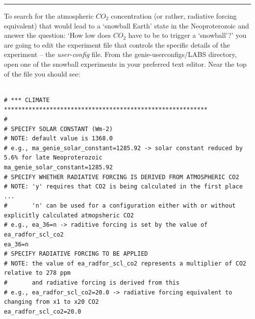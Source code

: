 \vspace{1mm}\noindent\rule{4cm}{0.5pt}\vspace{2mm}

\noindent To search for the atmospheric \(CO_{2}\) concentration (or rather, radiative forcing equivalent) that would lead to a ‘snowball Earth’ state in the Neoproterozoic and answer the question:
‘How low does \(CO_{2}\) have to be to trigger a ‘snowball’?’
you are going to edit the experiment file that controls the specific details of the experiment -- the \textit{user-config} file. From the \textsf{\footnotesize genie-userconfigs/LABS} directory, open one of the snowball experiments in your preferred  text editor. Near the top of the file you should see:

\vspace{-2mm}\footnotesize\begin{verbatim}

# *** CLIMATE **********************************************************
#
# SPECIFY SOLAR CONSTANT (Wm-2)
# NOTE: default value is 1368.0
# e.g., ma_genie_solar_constant=1285.92 -> solar constant reduced by 5.6% for late Neoproterozoic
ma_genie_solar_constant=1285.92
# SPECIFY WHETHER RADIATIVE FORCING IS DERIVED FROM ATMOSPHERIC CO2	
# NOTE: 'y' requires that CO2 is being calculated in the first place ...
#       'n' can be used for a configuration either with or without explicitly calculated atmopsheric CO2
# e.g., ea_36=n -> raditive forcing is set by the value of ea_radfor_scl_co2
ea_36=n
# SPECIFY RADIATIVE FORCING TO BE APPLIED
# NOTE: the value of ea_radfor_scl_co2 represents a multiplier of CO2 relative to 278 ppm 
#       and radiative forcing is derived from this
# e.g., ea_radfor_scl_co2=20.0 -> radiative forcing equivalent to changing from x1 to x20 CO2
ea_radfor_scl_co2=20.0
\end{verbatim}\normalsize\vspace{-1mm}

\newpage

